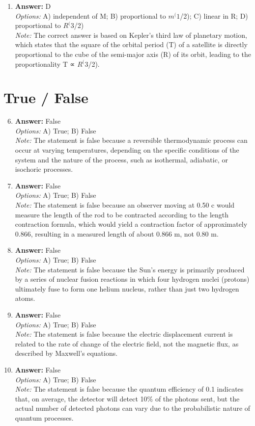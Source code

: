 \documentclass[12pt]{article}
\begin{document}
\begin{enumerate}[label=\arabic*.]
\item \textbf{Answer:} D
\\ \textit{Options:} A) independent of M; B) proportional to $m^(1$/2); C) linear in R; D) proportional to $R^(3$/2)
\\ \textit{Note:} The correct answer is based on Kepler's third law of planetary motion, which states that the square of the orbital period (T) of a satellite is directly proportional to the cube of the semi-major axis (R) of its orbit, leading to the proportionality T ∝ $R^(3$/2).
\end{enumerate}

\section*{True / False}
\begin{enumerate}[label=\arabic*.]
\setcounter{enumi}{5}
\item \textbf{Answer:} False
\\ \textit{Options:} A) True; B) False
\\ \textit{Note:} The statement is false because a reversible thermodynamic process can occur at varying temperatures, depending on the specific conditions of the system and the nature of the process, such as isothermal, adiabatic, or isochoric processes.
\item \textbf{Answer:} False
\\ \textit{Options:} A) True; B) False
\\ \textit{Note:} The statement is false because an observer moving at 0.50 c would measure the length of the rod to be contracted according to the length contraction formula, which would yield a contraction factor of approximately 0.866, resulting in a measured length of about 0.866 m, not 0.80 m.
\item \textbf{Answer:} False
\\ \textit{Options:} A) True; B) False
\\ \textit{Note:} The statement is false because the Sun's energy is primarily produced by a series of nuclear fusion reactions in which four hydrogen nuclei (protons) ultimately fuse to form one helium nucleus, rather than just two hydrogen atoms.
\item \textbf{Answer:} False
\\ \textit{Options:} A) True; B) False
\\ \textit{Note:} The statement is false because the electric displacement current is related to the rate of change of the electric field, not the magnetic flux, as described by Maxwell's equations.
\item \textbf{Answer:} False
\\ \textit{Options:} A) True; B) False
\\ \textit{Note:} The statement is false because the quantum efficiency of 0.1 indicates that, on average, the detector will detect 10\% of the photons sent, but the actual number of detected photons can vary due to the probabilistic nature of quantum processes.
\end{enumerate}
\end{document}
